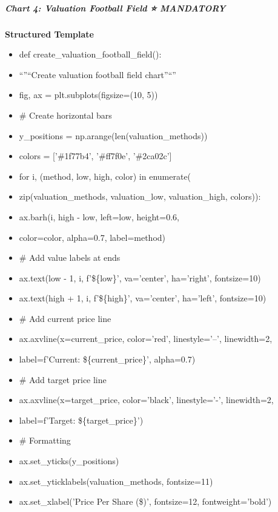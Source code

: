 \documentclass[11pt]{article}
\begin{document}
\subparagraph{Chart 4: Valuation Football Field ⭐ MANDATORY}\mbox{}\par

\textbf{Structured Template}
\begin{itemize}[leftmargin=*,itemsep=2pt,topsep=2pt]
\item {} def create\_\allowbreak{}valuation\_\allowbreak{}football\_\allowbreak{}field():
\item {} ``''``Create valuation football field chart''``''
\item {} fig, ax = plt.subplots(figsize=(10, 5))
\item {} \# Create horizontal bars
\item {} y\_\allowbreak{}positions = np.arange(len(valuation\_\allowbreak{}methods))
\item {} colors = ['\#1f77b4', '\#ff7f0e', '\#2ca02c']
\item {} for i, (method, low, high, color) in enumerate(
\item {} zip(valuation\_\allowbreak{}methods, valuation\_\allowbreak{}low, valuation\_\allowbreak{}high, colors)):
\item {} ax.barh(i, high - low, left=low, height=0.6,
\item {} color=color, alpha=0.7, label=method)
\item {} \# Add value labels at ends
\item {} ax.text(low - 1, i, f'\$\{low\}', va='center', ha='right', fontsize=10)
\item {} ax.text(high + 1, i, f'\$\{high\}', va='center', ha='left', fontsize=10)
\item {} \# Add current price line
\item {} ax.axvline(x=current\_\allowbreak{}price, color='red', linestyle='--', linewidth=2,
\item {} label=f'Current: \$\{current\_\allowbreak{}price\}', alpha=0.7)
\item {} \# Add target price line
\item {} ax.axvline(x=target\_\allowbreak{}price, color='black', linestyle='-', linewidth=2,
\item {} label=f'Target: \$\{target\_\allowbreak{}price\}')
\item {} \# Formatting
\item {} ax.set\_\allowbreak{}yticks(y\_\allowbreak{}positions)
\item {} ax.set\_\allowbreak{}yticklabels(valuation\_\allowbreak{}methods, fontsize=11)
\item {} ax.set\_\allowbreak{}xlabel('Price Per Share (\$)', fontsize=12, fontweight='bold')

\end{itemize}
\end{document}
